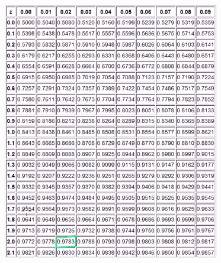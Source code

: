 \documentclass[11pt]{article}
\begin{document}
\begin{figure}[H]
\centering
\includegraphics[scale=0.6]{img/Selection_012}
\end{figure}

\end{document}
